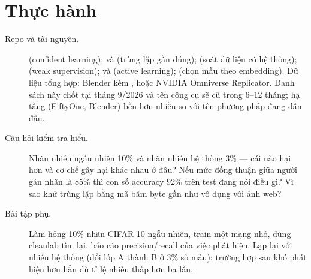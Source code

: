\documentclass[../../deep_learning.tex]{subfiles}
\begin{document}
\section{Thực hành}
\begin{description}
\item[Repo và tài nguyên.]  (confident learning);  và  (trùng lặp gần đúng);  (soát dữ liệu có hệ thống);  (weak supervision);  và  (active learning);  (chọn mẫu theo embedding). Dữ liệu tổng hợp: Blender kèm , hoặc NVIDIA Omniverse Replicator. Danh sách này chốt tại tháng 9/2026 và tên công cụ sẽ cũ trong 6--12 tháng; hạ tầng (FiftyOne, Blender) bền hơn nhiều so với tên phương pháp đang dẫn đầu.
\item[Câu hỏi kiểm tra hiểu.] Nhãn nhiễu ngẫu nhiên 10\%
 và nhãn nhiễu hệ thống 3\%
 --- cái nào hại hơn và cơ chế gây hại khác nhau ở đâu? Nếu mức đồng thuận giữa người gán nhãn là 85\%
 thì con số accuracy 92\%
trên test đang nói điều gì? Vì sao khử trùng lặp bằng mã băm byte gần như vô dụng với ảnh web?
\item[Bài tập phụ.] Làm hỏng 10\%
 nhãn CIFAR-10 ngẫu nhiên, train một mạng nhỏ, dùng cleanlab tìm lại, báo cáo precision/recall của việc phát hiện. Lặp lại với nhiễu hệ thống (đổi lớp A thành B ở 3\%
số mẫu): trường hợp sau khó phát hiện hơn hẳn dù tỉ lệ nhiễu thấp hơn ba lần.
\end{description}
\end{document}
